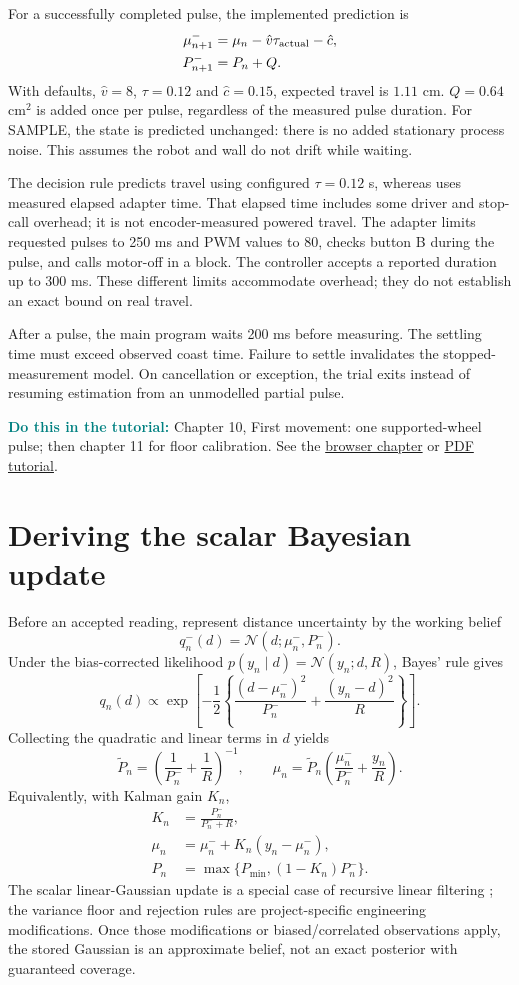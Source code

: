 \documentclass[11pt,a4paper]{article}
\newcommand{\code}[1]{\texttt{\detokenize{#1}}}
\newcommand{\tuto}[2]{\par\textcolor{teal}{\textbf{Do this in the tutorial:}} Chapter #1, #2. See the \href{Tutorial_A_to_Z.html\#t#1}{browser chapter} or \href{Tutorial_A_to_Z.pdf}{PDF tutorial}.\par}
\newcommand{\N}{\mathcal N}
\begin{document}
For a successfully completed pulse, the implemented prediction is
\begin{align}
 \mu_{n+1}^-&=\mu_n-\hat v\tau_{\rm actual}-\hat c,\label{eq:predictmean}\\
 P_{n+1}^-&=P_n+Q.\label{eq:predictvar}
\end{align}
With defaults, $\hat v=8$, $\tau=0.12$ and $\hat c=0.15$, expected travel is $1.11$ cm. $Q=0.64$ cm$^2$ is added once per pulse, regardless of the measured pulse duration. For SAMPLE, the state is predicted unchanged: there is no added stationary process noise. This assumes the robot and wall do not drift while waiting.

The decision rule predicts travel using configured $\tau=0.12$ s, whereas \code{record_move} uses measured elapsed adapter time. That elapsed time includes some driver and stop-call overhead; it is not encoder-measured powered travel. The adapter limits requested pulses to 250 ms and PWM values to 80, checks button B during the pulse, and calls motor-off in a \code{finally} block. The controller accepts a reported duration up to 300 ms. These different limits accommodate overhead; they do not establish an exact bound on real travel.

After a pulse, the main program waits 200 ms before measuring. The settling time must exceed observed coast time. Failure to settle invalidates the stopped-measurement model. On cancellation or exception, the trial exits instead of resuming estimation from an unmodelled partial pulse.
\tuto{10}{First movement: one supported-wheel pulse; then chapter 11 for floor calibration}

\section{Deriving the scalar Bayesian update}
Before an accepted reading, represent distance uncertainty by the working belief
\[
 q_n^-(d)=\N(d;\mu_n^-,P_n^-).
\]
Under the bias-corrected likelihood $p(y_n\mid d)=\N(y_n;d,R)$, Bayes' rule gives
\begin{equation}
 q_n(d)\propto \exp\left[-\frac12\left\{\frac{(d-\mu_n^-)^2}{P_n^-}+\frac{(y_n-d)^2}{R}\right\}\right].
\end{equation}
Collecting the quadratic and linear terms in $d$ yields
\begin{equation}
 \widetilde P_n=\left(\frac1{P_n^-}+\frac1R\right)^{-1},\qquad
 \mu_n=\widetilde P_n\left(\frac{\mu_n^-}{P_n^-}+\frac{y_n}{R}\right).
\end{equation}
Equivalently, with Kalman gain $K_n$,
\begin{align}
 K_n&=\frac{P_n^-}{P_n^-+R},\\
 \mu_n&=\mu_n^-+K_n(y_n-\mu_n^-),\label{eq:update}\\
 P_n&=\max\{P_{\min},(1-K_n)P_n^-\}.\label{eq:floor}
\end{align}
The scalar linear-Gaussian update is a special case of recursive linear filtering \cite{kalman}; the variance floor and rejection rules are project-specific engineering modifications. Once those modifications or biased/correlated observations apply, the stored Gaussian is an approximate belief, not an exact posterior with guaranteed coverage.
\end{document}
